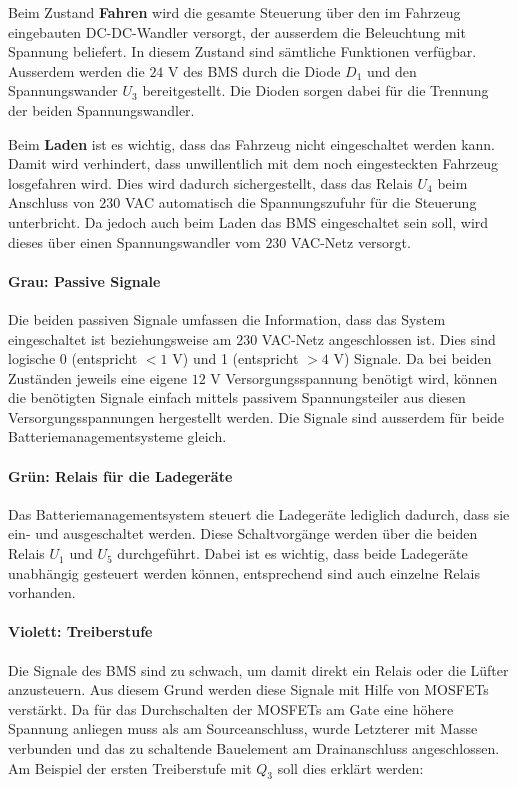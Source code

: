 Beim Zustand \textbf{Fahren} wird die gesamte Steuerung über den im Fahrzeug eingebauten DC-DC-Wandler versorgt, der ausserdem die Beleuchtung mit Spannung beliefert. In diesem Zustand sind sämtliche Funktionen verfügbar. Ausserdem werden die $24$ V des BMS durch die Diode $D_1$ und den Spannungswander $U_3$ bereitgestellt. Die Dioden sorgen dabei für die Trennung der beiden Spannungswandler.

Beim \textbf{Laden} ist es wichtig, dass das Fahrzeug nicht eingeschaltet werden kann. Damit wird verhindert, dass unwillentlich mit dem noch eingesteckten Fahrzeug losgefahren wird. Dies wird dadurch sichergestellt, dass das Relais $U_4$ beim Anschluss von $230$ VAC automatisch die Spannungszufuhr für die Steuerung unterbricht. Da jedoch auch beim Laden das BMS eingeschaltet sein soll, wird dieses über einen Spannungswandler vom $230$ VAC-Netz versorgt.

\paragraph{Grau: Passive Signale}
Die beiden passiven Signale umfassen die Information, dass das System eingeschaltet ist beziehungsweise am $230$ VAC-Netz angeschlossen ist. Dies sind logische 0 (entspricht $<1$ V) und 1 (entspricht $>4$ V) Signale. Da bei beiden Zuständen jeweils eine eigene $12$ V Versorgungsspannung benötigt wird, können die benötigten Signale einfach mittels passivem Spannungsteiler aus diesen Versorgungsspannungen hergestellt werden. Die Signale sind ausserdem für beide Batteriemanagementsysteme gleich.

\paragraph{Grün: Relais für die Ladegeräte}
Das Batteriemanagementsystem steuert die Ladegeräte lediglich dadurch, dass sie ein- und ausgeschaltet werden. Diese Schaltvorgänge werden über die beiden Relais $U_1$ und $U_5$ durchgeführt. Dabei ist es wichtig, dass beide Ladegeräte unabhängig gesteuert werden können, entsprechend sind auch einzelne Relais vorhanden.

\paragraph{Violett: Treiberstufe}
Die Signale des BMS sind zu schwach, um damit direkt ein Relais oder die Lüfter anzusteuern. Aus diesem Grund werden diese Signale mit Hilfe von MOSFETs verstärkt. Da für das Durchschalten der MOSFETs am Gate eine höhere Spannung anliegen muss als am Sourceanschluss, wurde Letzterer mit Masse verbunden und das zu schaltende Bauelement am Drainanschluss angeschlossen. Am Beispiel der ersten Treiberstufe mit $Q_3$ soll dies erklärt werden:

